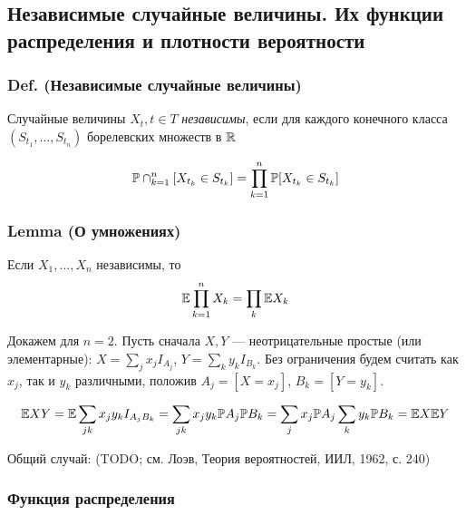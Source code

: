 \subsection{Независимые случайные величины. Их функции распределения и
плотности
вероятности}\label{ux43dux435ux437ux430ux432ux438ux441ux438ux43cux44bux435-ux441ux43bux443ux447ux430ux439ux43dux44bux435-ux432ux435ux43bux438ux447ux438ux43dux44b.-ux438ux445-ux444ux443ux43dux43aux446ux438ux438-ux440ux430ux441ux43fux440ux435ux434ux435ux43bux435ux43dux438ux44f-ux438-ux43fux43bux43eux442ux43dux43eux441ux442ux438-ux432ux435ux440ux43eux44fux442ux43dux43eux441ux442ux438}

\subsubsection{Def. (Независимые случайные
величины)}\label{def.-ux43dux435ux437ux430ux432ux438ux441ux438ux43cux44bux435-ux441ux43bux443ux447ux430ux439ux43dux44bux435-ux432ux435ux43bux438ux447ux438ux43dux44b}

Случайные величины \(X_t, t\in T\) \emph{независимы}, если для каждого
конечного класса \((S_{t_1},\ldots,S_{t_n})\) борелевских множеств в
\(\mathbb R\)

\[\mathbb P \cap_{k=1}^n [X_{t_k} \in S_{t_k}] = \prod_{k=1}^n \mathbb P [X_{t_k} \in S_{t_k}]\]

\subsubsection{Lemma (О
умножениях)}\label{lemma-ux43e-ux443ux43cux43dux43eux436ux435ux43dux438ux44fux445}

Если \(X_1, \ldots, X_n\) независимы, то
\[\mathbb E \prod_{k=1}^n X_k = \prod_k \mathbb E X_k\]

Докажем для \(n=2\). Пусть сначала \(X, Y\) --- неотрицательные простые
(или элементарные): \(X=\sum_j x_j I_{A_j}\),
\(Y = \sum_k y_k I_{B_k}\). Без ограничения будем считать как \(x_j\),
так и \(y_k\) различными, положив \(A_j = [X=x_j]\), \(B_k = [Y=y_k]\).

\[ \mathbb E XY = \mathbb E \sum_{jk} x_j y_k I_{A_j B_k} = \sum_{jk} x_j y_k \mathbb P A_j \mathbb P B_k = \sum_j x_j \mathbb P A_j \sum_k y_k \mathbb P B_k = \mathbb E X \mathbb E Y \]

Общий случай: (TODO; см. Лоэв, Теория вероятностей, ИИЛ, 1962, с. 240)

\subsubsection{Функция
распределения}\label{ux444ux443ux43dux43aux446ux438ux44f-ux440ux430ux441ux43fux440ux435ux434ux435ux43bux435ux43dux438ux44f}

